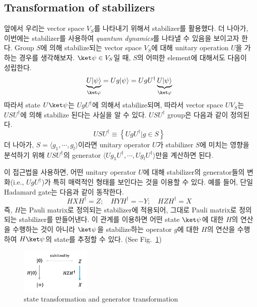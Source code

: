 \subsection{Transformation of stabilizers}
앞에서 우리는 vector space $V_S$를 나타내기 위해서 stabilizer를 활용했다. 더 나아가, 이번에는 stabilizer를 사용하여 \textit{quantum dynamics}를 나타낼 수 있음을 보이고자 한다. 
Group $S$에 의해 stabilize되는 vector space $V_S$에 대해 unitary operation $U$을 가하는 경우를 생각해보자. $\ket \psi \in V_S$일 때, $S$의 어떠한 element에 대해서도 다음이 성립한다.
\begin{equation*}
    \underbrace{U|\psi\rangle}_{\ket \varphi}=U g|\psi\rangle=U g U^{\dagger} \underbrace{U|\psi\rangle}_{\ket \varphi}
\end{equation*}
따라서 state $U\ket \psi$는 $UgU^\dagger$에 의해서 stabilize되며, 따라서 vector space $UV_S$는 $USU^\dagger$에 의해 stabilize 된다는 사실을 알 수 있다. $USU^\dagger$ group은 다음과 같이 정의된다.
\begin{equation*}
    U S U^{\dagger} \equiv\left\{U g U^{\dagger} | g \in S\right\}
\end{equation*}
더 나아가, $S = \langle g_1, \cdots, g_l \rangle$이라면 unitary operator $U$가 stabilizer $S$에 미치는 영향을 분석하기 위해 $USU^\dagger$의 generator $\langle Ug_1U^\dagger, \cdots, Ug_lU^\dagger\rangle$만을 계산하면 된다. 

\vspace{1em}
이 접근법을 사용하면, 어떤 unitary operator $U$에 대해 stabilizer의 generator들의 변화(i.e., $UgU^\dagger$)가 특히 매력적인 형태를 보인다는 것을 이용할 수 있다. 예를 들어, 단일 Hadamard gate는 다음과 같이 동작한다.
\begin{equation*}
    H X H^{\dagger}=Z ; \quad H Y H^{\dagger}=-Y ; \quad H Z H^{\dagger}=X
\end{equation*}
즉, $H$는 Pauli matrix로 정의되는 stabilizer에 적용되어, 그대로 Pauli matrix로 정의되는 stabilizer를 만들어낸다. 이 관계를 이용하면 어떤 state $\ket \psi$에 대한 $H$의 연산을 수행하는 것이 아니라 $\ket \psi$을 stabilize하는 operator $g$에 대한 $H$의 연산을 수행하여 $H\ket\psi$의 state를 추정할 수 있다. (See Fig.~\ref{fig:relation})
\begin{figure}[h]
    \centering
    \includegraphics[width=0.3\textwidth]{figures/isomorphism.png}
    \caption{state transformation and generator transformation}
    \label{fig:relation}
\end{figure}


